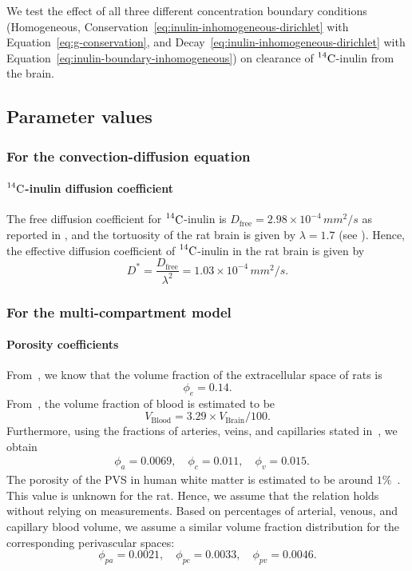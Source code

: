 \documentclass[a4paper,11pt]{article}
\newcommand{\1}{^{(1)}}
\newcommand{\2}{^{(2)}}
\newcommand{\Cinulin}{$\prescript{14}{}{\text{C}}$-inulin }
\begin{document}
We test the effect of all three different concentration boundary conditions (Homogeneous, Conservation~\eqref{eq:inulin-inhomogeneous-dirichlet} with Equation~\eqref{eq:g-conservation}, and Decay~\eqref{eq:inulin-inhomogeneous-dirichlet} with Equation~\eqref{eq:inulin-boundary-inhomogeneous}) on clearance of \Cinulin from the brain. 

\subsection{Parameter values}
\label{subsec:para-values}

\subsubsection{For the convection-diffusion equation}

\paragraph{\Cinulin diffusion coefficient}
The free diffusion coefficient for \Cinulin is $ D_\text{free} = 2.98 \times 10^{-4} \, \si{mm^2/s}$ as reported in \cite{lanman1971diffusion}, and the tortuosity of the rat brain is given by $ \lambda=1.7 $ (see \cite{Waters-2011-AB}). Hence, the effective diffusion coefficient of \Cinulin in the rat brain is given by
\[ 
  D^{*} = \frac{D_\text{free}}{\lambda^2} = 1.03\times 10^{-4} \, \si{mm^2/s}.
\]


\subsubsection{For the multi-compartment model}

\paragraph{Porosity coefficients}
From~\cite{Cserr-1991-Extracellular}, we know that the volume fraction of the extracellular space of rats is
\[
    \phi_e = 0.14.
\]
From~\cite{Adriana-2007-MR}, the volume fraction of blood is estimated to be 
\[
    V_\text{Blood} = 3.29 \times V_\text{Brain}/100.
\]
Furthermore, using the fractions of arteries, veins, and capillaries stated in~\cite{Qin-2019-Cerebral}, we obtain
\[
\begin{aligned}
    &\phi_a = 0.0069, \quad \phi_c = 0.011,\quad \phi_v = 0.015.
\end{aligned}
\]
The porosity of the PVS in human white matter is estimated to be around $1\%$~\cite{Barisano}. This value is unknown for the rat. Hence, we assume that the relation holds without relying on measurements. 
Based on percentages of arterial, venous, and capillary blood volume, we assume a similar volume fraction distribution for the corresponding perivascular spaces: 
\[
    \phi_{pa} = 0.0021, \quad \phi_{pc} = 0.0033,\quad \phi_{pv} = 0.0046.
\]
\end{document}
